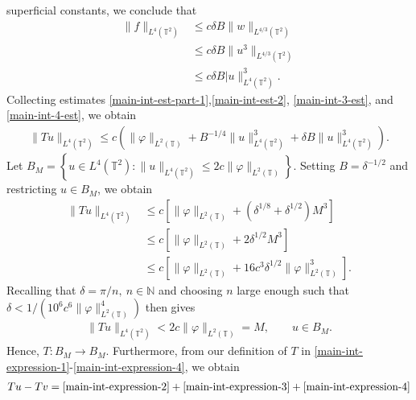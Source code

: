 \documentclass[12pt,reqno]{amsart}
\newcommand{\ci}{\mathbb{T}}
\newcommand{\vp}{\varphi}
\theoremstyle{plain}  %
\begin{document}
superficial constants, we conclude
that 
%
%
\begin{equation}
	\label{main-int-4-est}
	\begin{split}
		\|f\|_{L^4(\ci^2)}
		& \le c \delta B \|w\|_{L^{4/3}(\ci^2)}
		\\
		& \le c \delta B \|u^3\|_{L^{4/3}(\ci^2)}
		\\
		& \le c \delta B |u\|_{L^4(\ci^2)}^3.
	\end{split}
\end{equation}
%
%
Collecting estimates \eqref{main-int-est-part-1},\eqref{main-int-est-2}, 
\eqref{main-int-3-est}, and \eqref{main-int-4-est}, we obtain
%
%
\begin{equation}
	\label{1gh}
	\begin{split}
		\|Tu\|_{L^4(\ci^2)} \le c\left( \|\vp\|_{L^2(\ci)}
		+ B^{-1/4} \|u\|_{L^4(\ci^2)}^3 + \delta B \|u\|_{L^4(\ci^2)}^3 \right).
	\end{split}
\end{equation}
%
%
Let $B_M = \left\{ u \in L^4(\ci^2): \|u\|_{L^4(\ci^2)} \le 2c \|\vp 
\|_{L^2(\ci)} \right\}$. Setting $B = \delta^{-1/2}$ and restricting $u \in B_M$, we 
obtain %
%
\begin{equation*}
	\begin{split}
		\|Tu\|_{L^4(\ci^2)}
		& \le c \left[ \|\vp\|_{L^2(\ci)} + \left( \delta^{1/8} 
		+ \delta^{1/2} \right) M^3 \right]
		\\
		& \le c \left[ \|\vp\|_{L^2(\ci)} + 2 \delta^{1/2} M^3 \right]
		\\
		& \le c \left[ \|\vp\|_{L^2(\ci)} + 16c^3 \delta^{1/2} \|\vp\|_{L^2(\ci)}^3 
		\right].
	\end{split}
\end{equation*}
%
Recalling that  $\delta = \pi/n, \ n \in \mathbb{N}$ and choosing $n$ large enough 
such that $\delta < 1/(10^6 c^6 \|\vp\|_{L^2(\ci)}^4)$ then gives
%
%
\begin{equation}
	\label{ball-to-ball}
	\begin{split}
		\|Tu\|_{L^4(\ci^2)} < 2c\|\vp\|_{L^2(\ci)} = M, \qquad u \in B_M.
	\end{split}
\end{equation}
%
%
Hence, $T: B_M \to B_M$. Furthermore, from our definition of $T$ in 
\eqref{main-int-expression-1}-\eqref{main-int-expression-4}, we obtain
%
%
\begin{equation*}
	\begin{split}
		Tu - Tv = \eqref{main-int-expression-2} + 
		\eqref{main-int-expression-3} + \eqref{main-int-expression-4}
	\end{split}
\end{equation*}
\end{document}

